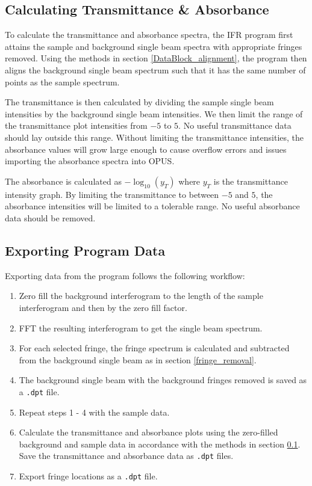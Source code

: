 \documentclass[a4paper, 12pt]{report}
\begin{document}
    \subsection{Calculating Transmittance \& Absorbance}\label{transmittance_and_absorbance}
    
    To calculate the transmittance and absorbance spectra, the IFR program first attains the sample and background single beam spectra with appropriate fringes removed. Using the methods in section \ref{DataBlock_alignment}, the program then aligns the background single beam spectrum such that it has the same number of points as the sample spectrum.
    
    The transmittance is then calculated by dividing the sample single beam intensities by the background single beam intensities. We then limit the range of the transmittance plot intensities from $-5$ to $5$. No useful transmittance data should lay outside this range. Without limiting the transmittance intensities, the absorbance values will grow large enough to cause overflow errors and issues importing the absorbance spectra into OPUS.
    
    The absorbance is calculated as $-\log_{10}(y_T)$ where $y_T$ is the transmittance intensity graph. By limiting the transmittance to between $-5$ and $5$, the absorbance intensities will be limited to a tolerable range. No useful absorbance data should be removed.
    
    \subsection{Exporting Program Data}\label{export_program_data}
    
    Exporting data from the program follows the following workflow:
    
    \begin{enumerate}
        \item Zero fill the background interferogram to the length of the sample interferogram and then by the zero fill factor.
        \item FFT the resulting interferogram to get the single beam spectrum.
        \item For each selected fringe, the fringe spectrum is calculated and subtracted from the background single beam as in section \ref{fringe_removal}.
        \item The background single beam with the background fringes removed is saved as a \verb|.dpt| file.
        \item Repeat steps 1 - 4 with the sample data.
        \item Calculate the transmittance and absorbance plots using the zero-filled background and sample data in accordance with the methods in section \ref{transmittance_and_absorbance}. Save the transmittance and absorbance data as \verb|.dpt| files.
        \item Export fringe locations as a \verb|.dpt| file.
    \end{enumerate}
\end{document}
